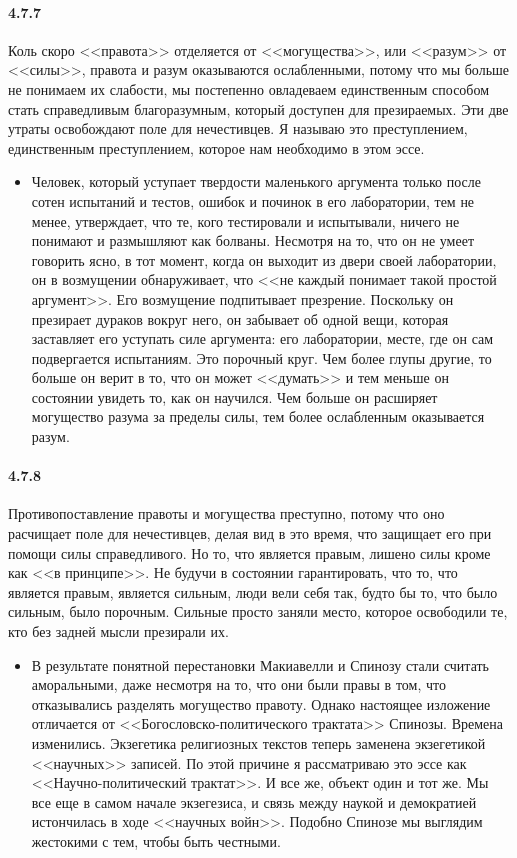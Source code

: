 \paragraph{4.7.7}\hypertarget{par:4.7.7}{} Коль скоро <<правота>> отделяется от <<могущества>>, или <<разум>> от <<силы>>, правота и разум оказываются ослабленными, потому что мы больше не понимаем их слабости, мы постепенно овладеваем единственным способом стать справедливым благоразумным, который доступен для презираемых. Эти две утраты освобождают поле для нечестивцев. Я называю это преступлением, единственным преступлением, которое нам необходимо в этом эссе.
	\begin{itemize}
	\item 
	Человек, который уступает твердости маленького аргумента только после сотен испытаний и тестов, ошибок и починок в его лаборатории, тем не менее, утверждает, что те, кого тестировали и испытывали, ничего не понимают и размышляют как болваны. Несмотря на то, что он не умеет говорить ясно, в тот момент, когда он выходит из двери своей лаборатории, он в возмущении обнаруживает, что <<не каждый понимает такой простой аргумент>>. Его возмущение подпитывает презрение. Поскольку он презирает дураков вокруг него, он забывает об одной вещи, которая заставляет его уступать силе аргумента: его лаборатории, месте, где он сам подвергается испытаниям. Это порочный круг. Чем более глупы другие, то больше он верит в то, что он может <<думать>> и тем меньше он состоянии увидеть то, как он научился. Чем больше он расширяет могущество разума за пределы силы, тем более ослабленным оказывается разум.
	\end{itemize}


\paragraph{4.7.8}\hypertarget{par:4.7.8}{} Противопоставление правоты и могущества преступно, потому что оно расчищает поле для нечестивцев, делая вид в это время, что защищает его при помощи силы справедливого. Но то, что является правым, лишено силы кроме как <<в принципе>>. Не будучи в состоянии гарантировать, что то, что является правым, является сильным, люди вели себя так, будто бы то, что было сильным, было порочным. Сильные просто заняли место, которое освободили те, кто без задней мысли презирали их.
	\begin{itemize}
	\item 
	В результате понятной перестановки Макиавелли и Спинозу стали считать аморальными, даже несмотря на то, что они были правы в том, что отказывались разделять могущество правоту. Однако настоящее изложение отличается от <<Богословско-политического трактата>> Спинозы. Времена изменились. Экзегетика религиозных текстов теперь заменена экзегетикой <<научных>> записей. По этой причине я рассматриваю это эссе как <<Научно-политический трактат>>. И все же, объект один и тот же. Мы все еще в самом начале экзегезиса, и связь между наукой и демократией истончилась в ходе <<научных войн>>. Подобно Спинозе мы выглядим жестокими с тем, чтобы быть честными.
	\end{itemize}	

